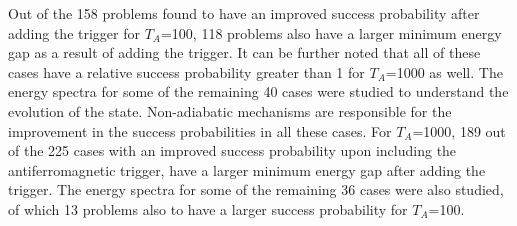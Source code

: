 \documentclass[../main.tex]{subfiles}
\begin{document}
Out of the 158 problems found to have an improved success probability after adding the trigger for $T_A$=100, 118 problems also have a larger minimum energy gap as a result of adding the trigger. It can be further noted that all of these cases have a relative success probability greater than 1 for $T_A$=1000 as well. The energy spectra for some of the remaining 40 cases were studied to understand the evolution of the state. Non-adiabatic mechanisms are responsible for the improvement in the success probabilities in all these cases.
For $T_A$=1000, 189 out of the 225 cases with an improved success probability upon including the antiferromagnetic trigger, have a larger minimum energy gap after adding the trigger. The energy spectra for some of the remaining 36 cases were also studied, of which 13 problems also to have a larger success probability for $T_A$=100.\\
\end{document}
